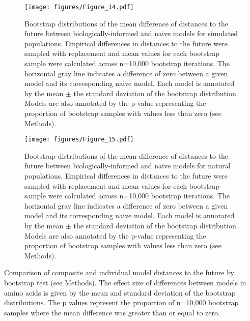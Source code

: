 \begin{figure}
  \begin{center}
  \texttt{[image: figures/Figure\_14.pdf]}
  \caption{
  Bootstrap distributions of the mean difference of distances to the future between biologically-informed and naive models for simulated populations.
  Empirical differences in distances to the future were sampled with replacement and mean values for each bootstrap sample were calculated across n=10,000 bootstrap iterations.
  The horizontal gray line indicates a difference of zero between a given model and its corresponding naive model.
  Each model is annotated by the mean $\pm$ the standard deviation of the bootstrap distribution.
  Models are also annotated by the p-value representing the proportion of bootstrap samples with values less than zero (see Methods).
  }
  \label{fig:bootstrap_distributions_for_simulated_sample_3}
  \end{center}
\end{figure}

\begin{figure}
  \begin{center}
  \texttt{[image: figures/Figure\_15.pdf]}
  \caption{
  Bootstrap distributions of the mean difference of distances to the future between biologically-informed and naive models for natural populations.
  Empirical differences in distances to the future were sampled with replacement and mean values for each bootstrap sample were calculated across n=10,000 bootstrap iterations.
  The horizontal gray line indicates a difference of zero between a given model and its corresponding naive model.
  Each model is annotated by the mean $\pm$ the standard deviation of the bootstrap distribution.
  Models are also annotated by the p-value representing the proportion of bootstrap samples with values less than zero (see Methods).
  }
  \label{fig:bootstrap_distributions_for_natural_sample_1_with_90_vpm_sliding}
  \end{center}
\end{figure}

\begin{table}[H]
  \begin{center}
    \scalebox{0.7}{
        
    }
    \caption{
      Comparison of composite and individual model distances to the future by bootstrap test (see Methods).
      The effect size of differences between models in amino acids is given by the mean and standard deviation of the bootstrap distributions.
      The p values represent the proportion of n=10,000 bootstrap samples where the mean difference was greater than or equal to zero.
    }
    \label{table:composite_vs_individual_model_comparison}
  \end{center}
\end{table}

